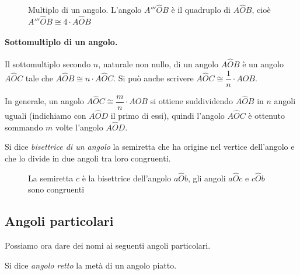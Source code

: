\begin{inaccessibleblock}
 \begin{figure}[htb]
\centering
\caption{Multiplo di un angolo. L'angolo \(A'''\widehat{O}B\) è il 
quadruplo di \(A\widehat{O}B\), cioè \(A'''\widehat{O}B \cong 4\cdot 
A\widehat{O}B\)}
\end{figure}
\end{inaccessibleblock}

\paragraph{Sottomultiplo di un angolo.} Il sottomultiplo secondo \(n\), 
naturale non nullo, di un angolo \(A\widehat{O}B\) è un angolo 
\(A\widehat{O}C\) tale che \(A\widehat{O}B \cong n\cdot A\widehat{O}C\). 
Si può anche scrivere \(A\widehat{O}C\cong \dfrac{1}{n}\cdot 
A\widehat{O}B\).

In generale, un angolo \(A\widehat{O}C\cong\dfrac{m}{n}\cdot 
A\widehat{O}B\) si ottiene suddividendo \(A\widehat{O}B\) in \(n\) angoli 
uguali (indichiamo con \(A\widehat{O}D\) il primo di essi), quindi 
l'angolo \(A\widehat{O}C\) è ottenuto sommando \(m\) volte l'angolo 
\(A\widehat{O}D\).

\begin{definizione}
Si dice \emph{bisettrice di un angolo} la semiretta che ha origine 
nel vertice dell'angolo e che lo divide in due angoli tra loro 
congruenti.
\end{definizione}


\begin{inaccessibleblock}
 \begin{figure}[htb]
\centering
\caption{La semiretta \(c\) è la bisettrice dell'angolo 
\(a\widehat{O}b\), gli angoli \(a\widehat{O}c\) e \(c\widehat{O}b\) sono 
congruenti}
\end{figure}
\end{inaccessibleblock}

\subsection{Angoli particolari}

Possiamo ora dare dei nomi ai seguenti angoli particolari.

\begin{definizione}
Si dice \emph{angolo retto} la metà di un angolo piatto.
\end{definizione}

